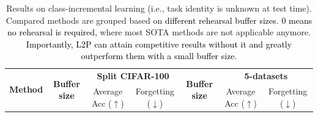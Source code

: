 \documentclass[10pt,twocolumn,letterpaper]{article}
\newcommand{\zizhaoz}[1]{\textcolor{black}{#1}}
\newcommand{\zifeng}[1]{\textcolor{black}{#1}}
\newcommand{\methodabbr}{L2P\xspace}
\begin{document}
\begin{table}[t]
\small
\caption{Results on class-incremental learning (i.e., task identity is unknown at test time). %
Compared methods are grouped based on \zifeng{different rehearsal buffer sizes. $0$ means no rehearsal is required,} where most SOTA methods are not applicable anymore.
\zizhaoz{Importantly, \methodabbr can attain competitive results without it and greatly outperform them with a small buffer size. }
} \vspace{-.3cm}
\label{table:task-inc}
\begin{center}
\begin{tabular}{l||c|cc||c|cc}
\toprule 
 \multirow{2}{*}{\textbf{Method}} & \multirow{2}{*}{\textbf{Buffer size}} & \multicolumn{2}{c||}{\textbf{Split CIFAR-100}} & \multirow{2}{*}{\textbf{Buffer size}} & \multicolumn{2}{c}{\textbf{5-datasets}} \\
& &  Average Acc ($\uparrow$) & Forgetting ($\downarrow$) & & Average Acc ($\uparrow$) & Forgetting ($\downarrow$) \\
\midrule
 

\end{tabular}
\end{center}
\end{table}
\end{document}
